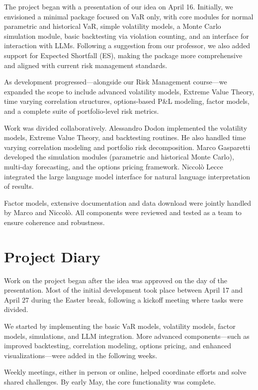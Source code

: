 \documentclass{article}
\begin{document}
The project began with a presentation of our idea on April 16. Initially, we envisioned a minimal package focused on VaR only, with core modules for normal parametric and historical VaR, simple volatility models, a Monte Carlo simulation module, basic backtesting via violation counting, and an interface for interaction with LLMs. Following a suggestion from our professor, we also added support for Expected Shortfall (ES), making the package more comprehensive and aligned with current risk management standards.

As development progressed—alongside our Risk Management course—we expanded the scope to include advanced volatility models, Extreme Value Theory, time varying correlation structures, options-based P\&L modeling, factor models, and a complete suite of portfolio-level risk metrics.

Work was divided collaboratively. Alessandro Dodon implemented the volatility models, Extreme Value Theory, and backtesting routines. He also handled time varying correlation modeling and portfolio risk decomposition. Marco Gasparetti developed the simulation modules (parametric and historical Monte Carlo), multi-day forecasting, and the options pricing framework. Niccolò Lecce integrated the large language model interface for natural language interpretation of results.

Factor models, extensive documentation and data download were jointly handled by Marco and Niccolò. All components were reviewed and tested as a team to ensure coherence and robustness.


\section{Project Diary}

Work on the project began after the idea was approved on the day of the presentation. Most of the initial development took place between April 17 and April 27 during the Easter break, following a kickoff meeting where tasks were divided.

We started by implementing the basic VaR models, volatility models, factor models, simulations, and LLM integration. More advanced components—such as improved backtesting, correlation modeling, options pricing, and enhanced visualizations—were added in the following weeks.

Weekly meetings, either in person or online, helped coordinate efforts and solve shared challenges. By early May, the core functionality was complete.
\end{document}
